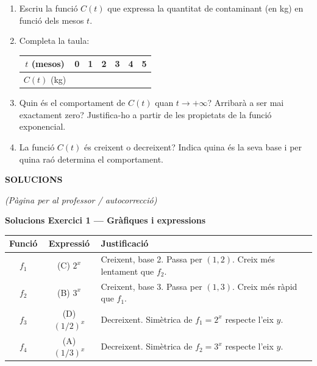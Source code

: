 \documentclass[12pt,a4paper]{article}
\begin{document}
\begin{enumerate}[label=\alph*), leftmargin=1.5cm, itemsep=0.3cm]
    \item Escriu la funci\'o $C(t)$ que expressa la quantitat de contaminant (en kg) en funci\'o dels mesos $t$.

    \item Completa la taula:

    \vspace{0.3cm}
    \begin{center}
    \renewcommand{\arraystretch}{2}
    \begin{tabular}{|c|c|c|c|c|c|c|}
    \hline
    $t$ (mesos) & 0 & 1 & 2 & 3 & 4 & 5 \\
    \hline
    $C(t)$ (kg) & & & & & & \\
    \hline
    \end{tabular}
    \end{center}

    \item Quin \'es el comportament de $C(t)$ quan $t \to +\infty$? Arribar\`a a ser mai exactament zero? Justifica-ho a partir de les propietats de la funci\'o exponencial.

    \item La funci\'o $C(t)$ \'es creixent o decreixent? Indica quina \'es la seva base i per quina ra\'o determina el comportament.
\end{enumerate}

\newpage


\begin{center}
    {\Large \textbf{SOLUCIONS}}
\end{center}

\vspace{0.2cm}
\begin{center}
\textit{(P\`agina per al professor / autocorrecci\'o)}
\end{center}

\vspace{0.4cm}

\noindent\textbf{Solucions Exercici 1 --- Gr\`afiques i expressions}

\begin{center}
\renewcommand{\arraystretch}{1.8}
\begin{tabular}{|c|c|l|}
\hline
\textbf{Funci\'o} & \textbf{Expressi\'o} & \textbf{Justificaci\'o} \\
\hline
$f_1$ & (C) $2^x$ & Creixent, base 2. Passa per $(1,2)$. Creix m\'es lentament que $f_2$. \\
\hline
$f_2$ & (B) $3^x$ & Creixent, base 3. Passa per $(1,3)$. Creix m\'es r\`apid que $f_1$. \\
\hline
$f_3$ & (D) $(1/2)^x$ & Decreixent. Sim\`etrica de $f_1=2^x$ respecte l'eix $y$. \\
\hline
$f_4$ & (A) $(1/3)^x$ & Decreixent. Sim\`etrica de $f_2=3^x$ respecte l'eix $y$. \\
\hline
\end{tabular}
\end{center}
\end{document}
